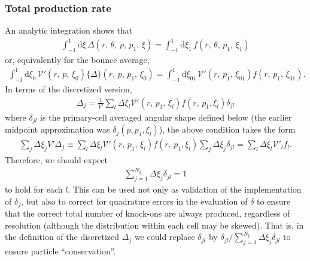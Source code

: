 \documentclass[11pt,a4paper]{article}
\newcommand{\rd}{\ensuremath{\mathrm{d}}}
\begin{document}
\subsubsection{Total production rate}
An analytic integration shows that 
\begin{align}
\int_{-1}^1 \rd \xi \, \Delta(r,\,\theta,\,p,\,p_1,\,\xi) = \int_{-1}^1\rd \xi_1 \, f(r,\,\theta,\,p_1,\,\xi_1)
\end{align}
or, equivalently for the bounce average,
\begin{align}
\int_{-1}^1 \rd \xi_0 \, \mathcal{V}'(r,\,p,\,\xi_0)\{\Delta\}(r,\,p,\,p_1,\,\xi_0) = \int_{-1}^1\rd\xi_{01}\,\mathcal{V}'(r,\,p_1,\,\xi_{01}) f(r,\,p_1,\,\xi_{01}).
\end{align} 
In terms of the discretized version,
\begin{align}
\Delta_j = \frac{1}{V'}\sum_l \Delta \xi_l \mathcal{V}'(r,\,p_1,\,\xi_l) f(r,\,p_1,\xi_l) \delta_{jl}
\end{align}
where $\delta_{jl}$ is the primary-cell averaged angular shape defined below
(the earlier midpoint approximation was $\delta_j(p,p_1,\xi_l)$), the above condition takes the form
\begin{align}
\sum_j \Delta \xi_j V' \Delta_j \equiv  \sum_l \Delta \xi_l \mathcal{V}'(r,\,p_1,\,\xi_l) f(r,\,p_1,\xi_l) \sum_j \Delta \xi_j \delta_{jl} = \sum_l \Delta\xi_l \mathcal{V}'_l f_l.
\end{align}
Therefore, we should expect
\begin{align}
\sum_{j=1}^{N_\xi} \Delta \xi_j\delta_{jl} = 1
\end{align}
to hold for each $l$. This can be used not only as validation of the implementation of $\delta_j$, but also to correct for quadrature errors in the evaluation of $\delta$ to ensure that the correct total number of knock-ons are always produced, regardless of resolution (although the distribution within each cell may be skewed). That is, in the definition of the discretized $\Delta_j$ we could replace $\delta_{jl}$ by $\delta_{jl}/\sum_{j=1}^{N_\xi} \Delta \xi_j\delta_{jl}$ to ensure particle ``conservation''.
\end{document}
